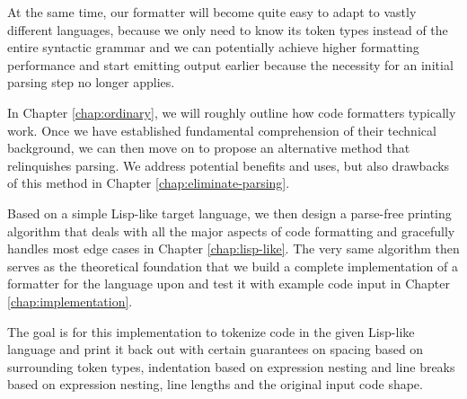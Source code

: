 At the same time, our formatter will become quite easy to adapt to vastly different languages,
because we only need to know its token types instead of the entire syntactic grammar and
we can potentially achieve higher formatting performance and start emitting output earlier
because the necessity for an initial parsing step no longer applies.

In Chapter \ref{chap:ordinary}, we will roughly outline how code formatters typically work.
Once we have established fundamental comprehension of their technical background,
we can then move on to propose an alternative method that relinquishes parsing.
We address potential benefits and uses,
but also drawbacks of this method in Chapter \ref{chap:eliminate-parsing}.

Based on a simple Lisp-like target language,
we then design a parse-free printing algorithm
that deals with all the major aspects of code formatting
and gracefully handles most edge cases
in Chapter \ref{chap:lisp-like}.
The very same algorithm then serves as the theoretical foundation
that we build a complete implementation of a formatter
for the language upon and test it with example code input
in Chapter \ref{chap:implementation}.

The goal is for this implementation to tokenize code in the given Lisp-like language
and print it back out with certain guarantees on
spacing based on surrounding token types,
indentation based on expression nesting and
line breaks based on expression nesting, line lengths and the original input code shape.
